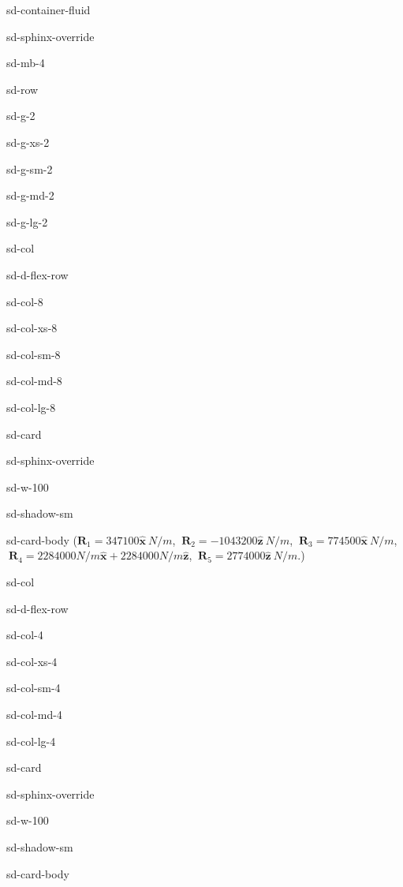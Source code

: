 \documentclass[letterpaper,10pt,italian]{jupyterBook}
\begin{document}
\begin{sphinxuseclass}{sd-container-fluid}
\begin{sphinxuseclass}{sd-sphinx-override}
\begin{sphinxuseclass}{sd-mb-4}
\begin{sphinxuseclass}{sd-row}
\begin{sphinxuseclass}{sd-g-2}
\begin{sphinxuseclass}{sd-g-xs-2}
\begin{sphinxuseclass}{sd-g-sm-2}
\begin{sphinxuseclass}{sd-g-md-2}
\begin{sphinxuseclass}{sd-g-lg-2}
\begin{sphinxuseclass}{sd-col}
\begin{sphinxuseclass}{sd-d-flex-row}
\begin{sphinxuseclass}{sd-col-8}
\begin{sphinxuseclass}{sd-col-xs-8}
\begin{sphinxuseclass}{sd-col-sm-8}
\begin{sphinxuseclass}{sd-col-md-8}
\begin{sphinxuseclass}{sd-col-lg-8}
\begin{sphinxuseclass}{sd-card}
\begin{sphinxuseclass}{sd-sphinx-override}
\begin{sphinxuseclass}{sd-w-100}
\begin{sphinxuseclass}{sd-shadow-sm}
\begin{sphinxuseclass}{sd-card-body}
\sphinxAtStartPar
(\(\mathbf{R}_1=347100\hat{\mathbf{x}}\  N/m\),
\(\ \mathbf{R}_2=- 1043200\hat{\mathbf{z}}\ N/m\),
\(\ \mathbf{R}_3=774500\hat{\mathbf{x}}\ N/m\),
\(\ \mathbf{R}_4=2284000 N/m \mathbf{\hat{x}} + 2284000 N/m \mathbf{\hat{z}}\),
\(\ \mathbf{R}_5=2774000\hat{\mathbf{z}}\ N/m\).)

\end{sphinxuseclass}
\end{sphinxuseclass}
\end{sphinxuseclass}
\end{sphinxuseclass}
\end{sphinxuseclass}
\end{sphinxuseclass}
\end{sphinxuseclass}
\end{sphinxuseclass}
\end{sphinxuseclass}
\end{sphinxuseclass}
\end{sphinxuseclass}
\end{sphinxuseclass}
\begin{sphinxuseclass}{sd-col}
\begin{sphinxuseclass}{sd-d-flex-row}
\begin{sphinxuseclass}{sd-col-4}
\begin{sphinxuseclass}{sd-col-xs-4}
\begin{sphinxuseclass}{sd-col-sm-4}
\begin{sphinxuseclass}{sd-col-md-4}
\begin{sphinxuseclass}{sd-col-lg-4}
\begin{sphinxuseclass}{sd-card}
\begin{sphinxuseclass}{sd-sphinx-override}
\begin{sphinxuseclass}{sd-w-100}
\begin{sphinxuseclass}{sd-shadow-sm}
\begin{sphinxuseclass}{sd-card-body}
\sphinxAtStartPar
{}


\end{sphinxuseclass}
\end{sphinxuseclass}
\end{sphinxuseclass}
\end{sphinxuseclass}
\end{sphinxuseclass}
\end{sphinxuseclass}
\end{sphinxuseclass}
\end{sphinxuseclass}
\end{sphinxuseclass}
\end{sphinxuseclass}
\end{sphinxuseclass}
\end{sphinxuseclass}
\end{sphinxuseclass}
\end{sphinxuseclass}
\end{sphinxuseclass}
\end{sphinxuseclass}
\end{sphinxuseclass}
\end{sphinxuseclass}
\end{sphinxuseclass}
\end{sphinxuseclass}
\end{sphinxuseclass}
\end{document}
